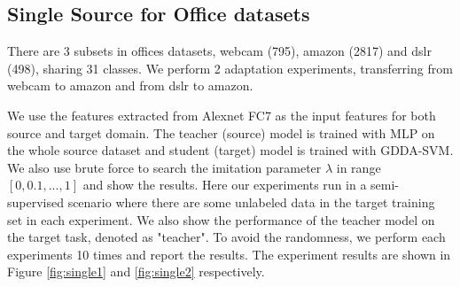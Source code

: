 \subsection{Single Source for Office datasets}
There are 3 subsets in offices datasets, webcam (795), amazon (2817) and dslr (498), sharing 31 classes. We perform 2 adaptation experiments, transferring from webcam to amazon and from dslr to amazon. 

We use the features extracted from Alexnet \cite{KrizhevskyNIPS12} FC7 as the input features for both source and target domain. The teacher (source) model is trained with MLP on the whole source dataset and student (target) model is trained with GDDA-SVM. We also use brute force to search the imitation parameter $\lambda$ in range $[0,0.1,...,1]$ and show the results. Here our experiments run in a semi-supervised scenario where there are some unlabeled data in the target training set in each experiment. We also show the performance of the teacher model on the target task, denoted as "teacher". To avoid the randomness, we perform each experiments 10 times and report the results. The experiment results are shown in Figure \ref{fig:single1} and \ref{fig:single2} respectively.


